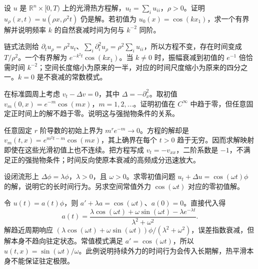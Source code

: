 \BookExercises

\begin{exercise}\label{g3:ex:heat-parabolic-scaling}
	设 \(u\) 是 \(\mathbb R^n\times[0,T)\) 上的光滑热方程解，\(u_t=\sum_i u_{ii}\)，\(\rho>0\)。证明 \(u_\rho(x,t)=u(\rho x,\rho^2t)\) 仍是解。若初值为 \(u_0(x)=\cos(kx_1)\)，求一个有界解并说明频率 \(k\) 的自然衰减时间为何与 \(k^{-2}\) 同阶。
\end{exercise}
\begin{solution}
	链式法则给 \(\partial_tu_\rho=\rho^2u_t\)、\(\sum_i\partial_i^2u_\rho=\rho^2\sum_i u_{ii}\)，所以方程不变，存在时间变成 \(T/\rho^2\)。一个有界解为 \(e^{-k^2t}\cos(kx_1)\)。当 \(k\ne0\) 时，振幅衰减到初值的 \(e^{-1}\) 倍恰需时间 \(k^{-2}\)；空间长度缩小为原来的一半，对应的时间尺度缩小为原来的四分之一。\(k=0\) 是不衰减的常数模式。
\end{solution}

\begin{exercise}\label{g3:ex:backward-heat-discontinuity}
	在标准圆周上考虑 \(v_t-\Delta v=0\)，其中 \(\Delta=-\partial_x^2\)。取初值 \(v_m(0,x)=e^{-m}\cos(mx)\)，\(m=1,2,\ldots\)。证明初值在 \(C^\infty\) 中趋于零，但任意固定正时间上的解不趋于零。说明这与强抛物条件的关系。
\end{exercise}
\begin{solution}
	任意固定 \(r\) 阶导数的初始上界为 \(m^re^{-m}\to0\)。方程的解却是 \(v_m(t,x)=e^{m^2t-m}\cos(mx)\)，其上确界在每个 \(t>0\) 趋于无穷。因而求解映射即使在这些光滑初值上也不连续。把方程写成 \(v_t=-v_{xx}\)，二阶系数是 \(-1\)，不满足正的强抛物条件；时间反向使原本衰减的高频成分迅速放大。
\end{solution}

\begin{exercise}\label{g3:ex:heat-periodic-forcing}
	设闭流形上 \(\Delta\phi=\lambda\phi\)，\(\lambda>0\)，且 \(\omega>0\)。求零初值问题 \(u_t+\Delta u=\cos(\omega t)\phi\) 的解，说明它的长时间行为。另求空间常值外力 \(\cos(\omega t)\) 对应的零初值解。
\end{exercise}
\begin{solution}
	令 \(u(t)=a(t)\phi\)，则 \(a'+\lambda a=\cos(\omega t)\)、\(a(0)=0\)。直接代入得
	\[
		a(t)=\frac{\lambda\cos(\omega t)+\omega\sin(\omega t)-\lambda e^{-\lambda t}}
		{\lambda^2+\omega^2}.
	\]
	解趋近周期响应 \((\lambda\cos(\omega t)+\omega\sin(\omega t))\phi/(\lambda^2+\omega^2)\)，误差指数衰减，但解本身不趋向驻定状态。常值模式满足 \(a'=\cos(\omega t)\)，所以 \(u(t,x)=\sin(\omega t)/\omega\)。此例说明持续外力的时间行为会传入长期解，热平滑本身不能保证驻定极限。
\end{solution}

